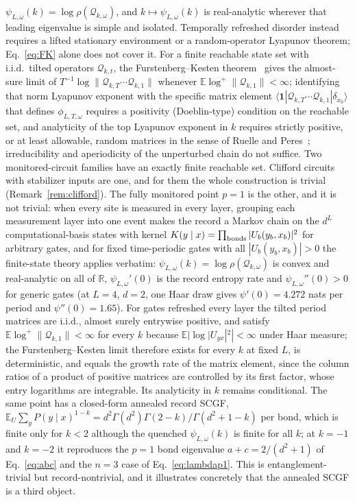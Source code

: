 \documentclass[aps,prx,reprint,superscriptaddress,nobibnotes,longbibliography]{revtex4-2}
\theoremstyle{remark}
\newcommand{\E}{\mathbb E}
\begin{document}
$\psi_{L,\omega}(k)=\log\rho(\mathcal Q_{k,\omega})$, and $k\mapsto\psi_{L,\omega}(k)$ is real-analytic wherever that leading eigenvalue is simple and isolated.  Temporally refreshed disorder instead requires a lifted stationary environment or a random-operator Lyapunov theorem; Eq.~\eqref{eq:FK} alone does not cover it.  For a finite reachable state set with i.i.d.\ tilted operators $\mathcal Q_{k,t}$, the Furstenberg--Kesten theorem~\cite{FurstenbergKesten1960} gives the almost-sure limit of $T^{-1}\log\|\mathcal Q_{k,T}\cdots\mathcal Q_{k,1}\|$ whenever $\E\log^+\|\mathcal Q_{k,1}\|<\infty$; identifying that norm Lyapunov exponent with the specific matrix element $\langle\mathbf 1|\mathcal Q_{k,T}\cdots\mathcal Q_{k,1}|\delta_{x_0}\rangle$ that defines $\phi_{L,T,\omega}$ requires a positivity (Doeblin-type) condition on the reachable set, and analyticity of the top Lyapunov exponent in $k$ requires strictly positive, or at least allowable, random matrices in the sense of Ruelle and Peres~\cite{Ruelle1979,Peres1992}; irreducibility and aperiodicity of the unperturbed chain do not suffice.  Two monitored-circuit families have an exactly finite reachable set.  Clifford circuits with stabilizer inputs are one, and for them the whole construction is trivial (Remark~\ref{rem:clifford}).  The fully monitored point $p=1$ is the other, and it is not trivial: when every site is measured in every layer, grouping each measurement layer into one event makes the record a Markov chain on the $d^L$ computational-basis states with kernel $K(y\mid x)=\prod_{\rm bonds}|U_b(y_b,x_b)|^2$ for arbitrary gates, and for fixed time-periodic gates with all $|U_b(y_b,x_b)|>0$ the finite-state theory applies verbatim: $\psi_{L,\omega}(k)=\log\rho(\mathcal Q_{k,\omega})$ is convex and real-analytic on all of $\mathbb R$, $\psi_{L,\omega}'(0)$ is the record entropy rate and $\psi_{L,\omega}''(0)>0$ for generic gates (at $L=4$, $d=2$, one Haar draw gives $\psi'(0)=4.272$ nats per period and $\psi''(0)=1.65$).  For gates refreshed every layer the tilted period matrices are i.i.d., almost surely entrywise positive, and satisfy $\E\log^+\|\mathcal Q_{k,1}\|<\infty$ for every $k$ because $\E|\log|U_{yx}|^2|<\infty$ under Haar measure; the Furstenberg--Kesten limit therefore exists for every $k$ at fixed $L$, is deterministic, and equals the growth rate of the matrix element, since the column ratios of a product of positive matrices are controlled by its first factor, whose entry logarithms are integrable.  Its analyticity in $k$ remains conditional.  The same point has a closed-form annealed record SCGF, $\E_U\sum_yP(y\mid x)^{1-k}=d^2\Gamma(d^2)\Gamma(2-k)/\Gamma(d^2+1-k)$ per bond, which is finite only for $k<2$ although the quenched $\psi_{L,\omega}(k)$ is finite for all $k$; at $k=-1$ and $k=-2$ it reproduces the $p=1$ bond eigenvalue $a+c=2/(d^2+1)$ of Eq.~\eqref{eq:abc} and the $n=3$ case of Eq.~\eqref{eq:lambdap1}.  This is entanglement-trivial but record-nontrivial, and it illustrates concretely that the annealed SCGF is a third object.
\end{document}
